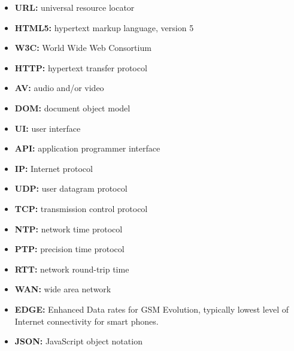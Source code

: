 \begin{itemize}
\item{\textbf{URL:} universal resource locator}
\item{\textbf{HTML5:} hypertext markup language, version 5}
\item{\textbf{W3C:} World Wide Web Consortium}
\item{\textbf{HTTP:} hypertext transfer protocol}
\item{\textbf{AV:} audio and/or video}
\item{\textbf{DOM:} document object model}
\item{\textbf{UI:} user interface}
\item{\textbf{API:} application programmer interface}
\item{\textbf{IP:} Internet protocol}
\item{\textbf{UDP:} user datagram protocol}
\item{\textbf{TCP:} transmission control protocol}
\item{\textbf{NTP:} network time protocol}
\item{\textbf{PTP:} precision time protocol}
\item{\textbf{RTT:} network round-trip time}
\item{\textbf{WAN:} wide area network}
\item{\textbf{EDGE:} Enhanced Data rates for GSM Evolution, typically lowest level of Internet connectivity for smart phones.}
\item{\textbf{JSON:} JavaScript object notation}
\end{itemize}

